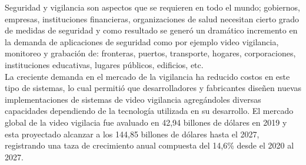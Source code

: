Seguridad y vigilancia son aspectos que se requieren en todo el mundo; gobiernos, empresas, instituciones financieras, organizaciones de salud necesitan cierto grado de medidas de seguridad y como resultado se generó un dramático incremento en la demanda de aplicaciones de seguridad como por ejemplo video vigilancia, monitoreo y grabación de: fronteras, puertos, transporte, hogares, corporaciones, instituciones educativas, lugares públicos, edificios, etc.\\

La creciente demanda en el mercado de la vigilancia ha reducido costos en este tipo de sistemas, lo cual permitió que desarrolladores y fabricantes diseñen nuevas implementaciones de sistemas de video vigilancia agregándoles diversas capacidades dependiendo de la tecnología utilizada en su desarrollo. El mercado global de la video vigilacia fue avaluado en 42,94 billones de dólares en 2019 y esta proyectado alcanzar a los 144,85 billones de dólares hasta el 2027, registrando una taza de crecimiento anual compuesta del 14,6\% desde el 2020 al 2027.\\
